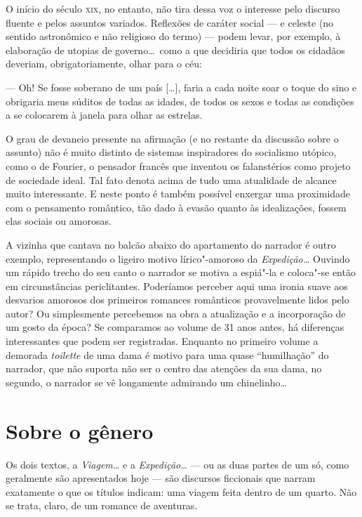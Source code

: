 O início do século \textsc{xix}, no entanto, não tira dessa voz o interesse pelo
discurso fluente e pelos assuntos variados. Reflexões de caráter social
--- e celeste (no sentido astronômico e não religioso do termo) --- podem
levar, por exemplo, à elaboração de utopias de governo\ldots\ como a que
decidiria que todos os cidadãos deveriam, obrigatoriamente, olhar para o céu: 

\begin{hedraquote}
--- Oh! Se fosse soberano de um país [\ldots], faria a cada noite
soar o toque do sino e obrigaria meus súditos de todas as idades, de
todos os sexos e todas as condições a se colocarem à janela para olhar
as estrelas.
\end{hedraquote}

O grau de devaneio presente na afirmação (e no restante da discussão
sobre o assunto) não é muito distinto de sistemas inspiradores do
socialismo utópico, como o de Fourier, o pensador francês que inventou
os falanstérios como projeto de sociedade ideal. Tal fato denota acima
de tudo uma atualidade de alcance muito interessante. E neste ponto é
também possível enxergar uma proximidade com o pensamento romântico,
tão dado à evasão quanto às idealizações, fossem elas sociais ou
amorosas.

 A vizinha que cantava no balcão abaixo do apartamento do narrador é
outro exemplo, representando o ligeiro motivo lírico"-amoroso da
\textit{Expedição\ldots} Ouvindo um rápido trecho do seu canto o narrador
se motiva a espiá"-la e coloca"-se então em circunstâncias periclitantes.
Poderíamos perceber aqui uma ironia suave aos desvarios amorosos dos
primeiros romances românticos provavelmente lidos pelo autor? Ou
simplesmente percebemos na obra a atualização e a incorporação de um
gosto da época? Se comparamos ao volume de 31 anos antes, há diferenças
interessantes que podem ser registradas. Enquanto no primeiro volume a
demorada \textit{toilette} de uma dama é motivo para uma quase
``humilhação'' do narrador, que não suporta não ser o centro das atenções
da sua dama, no segundo, o narrador se vê longamente admirando um
chinelinho\ldots 

\section{Sobre o gênero}

Os dois textos, a \textit{Viagem\ldots} e a \textit{Expedição\ldots} --- ou as
duas partes de um só, como geralmente são apresentados hoje --- são
discursos ficcionais que narram exatamente o que os títulos indicam:
uma viagem feita dentro de um quarto. Não se trata, claro, de um
romance de aventuras. 

